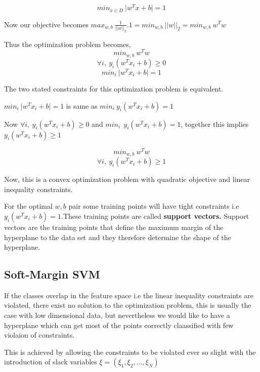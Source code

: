 \documentclass[12pt]{article}
\begin{document}
 $$min_{x\in D}  \ \vert w^{T}x+b \vert = 1$$
 
 Now our objective becomes $max_{w,b} \  \frac{1} {\vert \vert w \vert \vert_{2}} . 1 = min_{w,b} \ \vert \vert w \vert \vert_{2} = min_{w,b} \  w^{T}w$
 
Thus the optimization problem becomes,
$$min_{w,b} \  w^{T}w$$
$$\forall i, \ y_{i}(w^{T}x_{i} + b) \geq 0$$
$$ min_{i} \  \vert w^{T}x_{i} +b \vert = 1$$ 

The two stated constraints for this optimization problem is equivalent.

$ min_{i} \  \vert w^{T}x_{i} +b \vert = 1$ is same as $ min_{i} \  y_{i}(w^{T}x_{i} + b) = 1$

Now $\forall i, \ y_{i}(w^{T}x_{i} + b) \geq 0$ and $min_{i} \ \ y_{i}(w^{T}x_{i} + b) = 1$, together this implies $ y_{i}(w^{T}x_{i} + b) \geq 1$
 
 
 
 
 
 
 $$min_{w,b} \  w^{T}w$$
 $$\forall i, \ y_{i}(w^{T}x_{i} + b) \geq 1$$
 
 
 
 
 
 
 
 
 
 
 
 
 Now, this is a convex optimization problem with quadratic objective and linear inequality constraints.
 
 
 For the optimal $w,b$ pair some training points will have tight constraints i.e $y_{i}(w^{T}x_{i} + b) = 1$.These training points are called \textbf{support vectors.} Support vectors  are the training points that define the maximum margin of the hyperplane to the data set and they therefore determine the shape of the hyperplane. 
 
 
 \subsection{Soft-Margin SVM}
 
 
 If the classes  overlap in the feature space i.e the linear inequality constraints are violated, there exist no solution to the optimization problem, this is usually the case with low dimensional data, but nevertheless we would like to have a hyperplane which can get most of the points correctly claassified with few violaion of constraints.
 
 
This is achieved by allowing the constraints to be violated ever so slight with the introduction of slack variables $\xi = (\xi_{1},\xi_{2}, ..., \xi_{N})$ 
   
\end{document}
